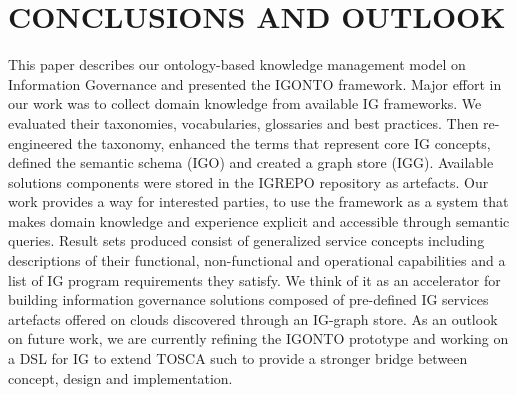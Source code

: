\documentclass[a4paper,twoside]{article}
\begin{document}
\section{\uppercase{Conclusions and Outlook}}
\label{sec:conclusion}
This paper describes our ontology-based knowledge management model on Information Governance and presented the IGONTO framework. Major effort in our work was to collect domain knowledge from available IG frameworks. We evaluated their taxonomies, vocabularies, glossaries and best practices. Then re-engineered the taxonomy, enhanced the terms that represent core IG concepts, defined the semantic schema (IGO) and created a graph store (IGG). Available solutions components were stored in the IGREPO repository as artefacts. Our work provides a way for interested parties, to use the framework as a system that makes domain knowledge and experience explicit and accessible through semantic queries. Result sets produced consist of generalized service concepts including descriptions of their functional, non-functional and operational capabilities and a list of IG program requirements they satisfy. We think of it as an accelerator for building information governance solutions composed of pre-defined IG services artefacts offered on clouds discovered through an IG-graph store. As an outlook on future work, we are currently refining the IGONTO prototype and working on a DSL for IG to extend TOSCA such to provide a stronger bridge between concept, design and implementation.
%
%

{\small
}
%
\end{document}
